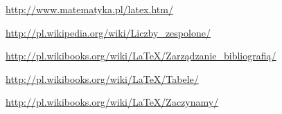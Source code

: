 \documentclass[a4paper,11pt]{article}
\begin{document}
\begin{thebibliography}{99}
\item \url{http://www.matematyka.pl/latex.htm/}
\item \url{http://pl.wikipedia.org/wiki/Liczby_zespolone/}
\item \url{http://pl.wikibooks.org/wiki/LaTeX/Zarządzanie_bibliografią/}
\item \url{http://pl.wikibooks.org/wiki/LaTeX/Tabele/}
\item \url{http://pl.wikibooks.org/wiki/LaTeX/Zaczynamy/}
\end{thebibliography}
\end{document}
